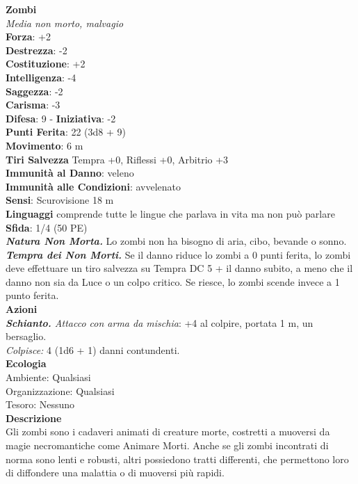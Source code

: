 \begin{multicols}{2}
\medskip\textbf{Zombi}\\
\emph{Media non morto, malvagio}\\
\textbf{Forza}: +2\\
\textbf{Destrezza}: -2\\
\textbf{Costituzione}: +2\\
\textbf{Intelligenza}: -4\\
\textbf{Saggezza}: -2\\
\textbf{Carisma}: -3\\
\textbf{Difesa}: 9 - \textbf{Iniziativa}: -2\\
\textbf{Punti Ferita}: 22 (3d8 + 9)\\
\textbf{Movimento}: 6 m\\
\textbf{Tiri Salvezza}  Tempra +0, Riflessi +0, Arbitrio +3\\
\textbf{Immunità al Danno}: veleno\\
\textbf{Immunità alle Condizioni}: avvelenato\\
\textbf{Sensi}: Scurovisione 18 m\\
\textbf{Linguaggi} comprende tutte le lingue che parlava in vita ma non può parlare\\
\textbf{Sfida}: 1/4 (50 PE)\smallskip\\
\emph{\textbf{Natura Non Morta.}} Lo zombi non ha bisogno di aria, cibo, bevande o sonno.\\
\emph{\textbf{Tempra dei Non Morti.}} Se il danno riduce lo zombi a 0 punti ferita, lo zombi deve effettuare un tiro salvezza su Tempra DC 5 + il danno subito, a meno che il danno non sia da Luce o un colpo critico. Se riesce, lo zombi scende invece a 1 punto ferita.\\
\smallskip\textbf{Azioni}\\
\emph{\textbf{Schianto.} Attacco con arma da mischia}: +4 al colpire, portata 1 m, un bersaglio.\\
\emph{Colpisce:} 4 (1d6 + 1) danni contundenti.\\
\textbf{Ecologia}\\
Ambiente: Qualsiasi\\
Organizzazione: Qualsiasi\\
Tesoro: Nessuno\\
\textbf{Descrizione}\\
Gli zombi sono i cadaveri animati di creature morte, costretti a muoversi da magie necromantiche come Animare Morti. Anche se gli zombi incontrati di norma sono lenti e robusti, altri possiedono tratti differenti, che permettono loro di diffondere una malattia o di muoversi più rapidi.\\


\end{multicols}
